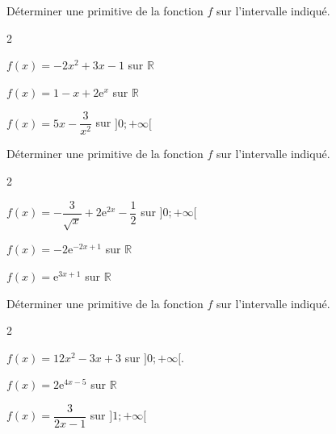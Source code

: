 \documentclass[11pt,a4paper]{article}  %
\begin{document}
	\graphicspath{{images/}}
	
	\begin{center}
		
		
	\end{center}
	
\vspace*{-0.5cm}
\exerciceDS{}
Déterminer une primitive de la fonction $f$ sur l'intervalle indiqué.

\begin{multicols}{2}
	\begin{enumMet}
	\item $f(x)=-2 x^2+3 x-1$ sur $\mathbb{R}$
	\item $f(x)=1-x+2 \mathrm{e}^x$ sur $\mathbb{R}$
	\item $f(x)=5 x-\dfrac{3}{x^2}$ sur $] 0 ;+\infty[$
\end{enumMet}
\end{multicols}

\vspace*{-0.5cm}
\exerciceDS{}
Déterminer une primitive de la fonction $f$ sur l'intervalle indiqué.

\begin{multicols}{2}
	\begin{enumMet}
	\item $f(x)=-\dfrac{3}{\sqrt{x}}+2 \mathrm{e}^{2 x}-\dfrac{1}{2}$ sur $] 0 ;+\infty[$
	\item $f(x)=-2 \mathrm{e}^{-2 x+1}$ sur $\mathbb{R}$
	\item $f(x)=\mathrm{e}^{3 x+1}$ sur $\mathbb{R}$
\end{enumMet}
\end{multicols}

\vspace*{-0.5cm}
\exerciceDS{}

Déterminer une primitive de la fonction $f$ sur l'intervalle indiqué.

\begin{multicols}{2}
	\begin{enumMet}
		\item $f(x)=12 x^2-3 x+3$ sur $] 0 ;+\infty[$.
		\item $f(x)=2 \mathrm{e}^{4 x-5}$ sur $\mathbb{R}$
		\item $f(x)=\dfrac{3}{2 x-1}$ sur $]1; +\infty [$
	\end{enumMet}
\end{multicols}
\end{document}
